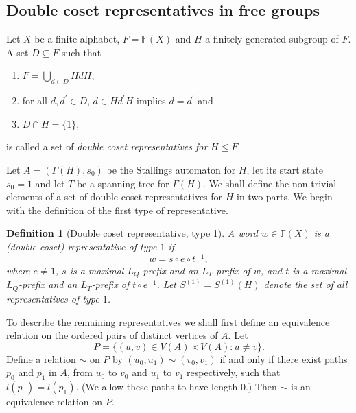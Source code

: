 \documentclass[a4paper,12pt]{article}
\newcommand{\G}{\Gamma }
\newtheorem{definition}[theorem]{Definition}
\numberwithin{equation}{section}
\numberwithin{figure}{section}
\newcommand{\FF}{\ensuremath{\mathbb{F}}}
\newcommand{\be}{\begin{enumerate}}
\newcommand{\ee}{\end{enumerate}}
\begin{document}
\subsection{Double coset representatives in free groups}\label{sub:2cosetrepr}
Let $X$ be a finite alphabet, $F=\FF(X)$ and $H$ a finitely generated subgroup
of $F$.
A  set $D\subseteq F$ such that
\be
\item
$F = \displaystyle{\bigcup_{d \in D} HdH}$, 
\item
for all $d, d^\prime \in D$, $d\in H d^\prime H$
implies $d=d^\prime$ and 
\item $D\cap H=\{1\}$, 
\ee
is called a set of \emph{double coset representatives for} $H\le F$.


Let $A=(\G(H),s_0)$ be the Stallings automaton for $H$, let its start state 
$s_0=1$  and let  $T$ be
a spanning tree for $\G(H)$.
We shall define the non-trivial elements of  a set of double coset representatives for $H$ in two parts.
We begin with the definition of the first  type of representative.
\begin{definition}[Double coset representative, type 1] \label{def:repres_t1}
A word $w\in \FF(X)$ is a {\em (double coset) representative of
type} $1$ if
\[w=s\circ e \circ t^{-1},\]
where $e\neq 1$, $s$ is a maximal $L_Q$-prefix and an $L_T$-prefix of $w$,
and $t$ is a maximal $L_Q$-prefix and an
$L_T$-prefix of $t\circ e^{-1}$. Let $S^{(1)}=S^{(1)}(H)$ denote the set of all representatives of type $1$.
\end{definition}


To describe the remaining representatives we shall first define an equivalence
relation on the ordered pairs of distinct vertices of $A$. Let
\[P=\{(u,v)\in V(A)\times V(A): u\neq v\}.\]
Define a relation $\sim$ on $P$ by $(u_0,u_1)\sim (v_0,v_1)$ if and only if
there exist paths $p_0$ and $p_1$ in $A$, from $u_0$ to $v_0$ and $u_1$ to $v_1$
respectively, such that $l(p_0)=l(p_1)$. (We allow these paths to have length $0$.)
Then $\sim$ is an equivalence relation on $P$.
\end{document}
